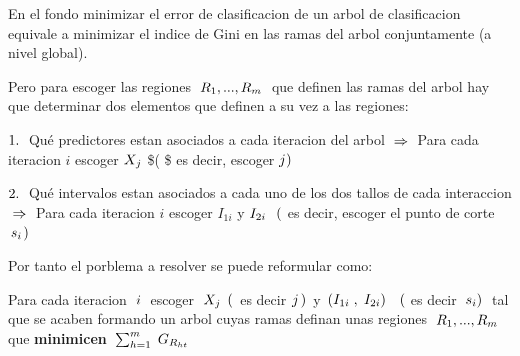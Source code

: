 \documentclass[
  11pt,
  a4paper,
]{article}
\begin{document}
En el fondo minimizar el error de clasificacion de un arbol de
clasificacion equivale a minimizar el indice de Gini en las ramas del
arbol conjuntamente (a nivel global).

\vspace{0.35cm}

Pero para escoger las regiones
\(\hspace{0.1cm} R_1,...,R_m \hspace{0.1cm}\) que definen las ramas del
arbol hay que determinar dos elementos que definen a su vez a las
regiones:

\(1.\hspace{0.1cm}\) Qué predictores estan asociados a cada iteracion
del arbol \(\hspace{0.1cm} \Rightarrow \hspace{0.1cm}\) Para cada
iteracion \(i\) escoger \(X_j \hspace{0.01cm}\) \$(\hspace{0.01cm} \$ es
decir, escoger \(j \hspace{0.01cm})\)

\(2.\hspace{0.1cm}\) Qué intervalos estan asociados a cada uno de los
dos tallos de cada interaccion
\(\hspace{0.1cm} \Rightarrow \hspace{0.1cm}\) Para cada iteracion \(i\)
escoger \(I_{1i}\) y \(I_{2i}\hspace{0.1cm}\) \((\hspace{0.01cm}\) es
decir, escoger el punto de corte
\(\hspace{0.07cm}s_i \hspace{0.04cm} )\)

\vspace{0.35cm}

Por tanto el porblema a resolver se puede reformular como:

Para cada iteracion \(\hspace{0.1cm} i \hspace{0.1cm}\) escoger
\(\hspace{0.1cm} X_j\hspace{0.01cm}\) \((\hspace{0.05cm}\) es decir
\(\hspace{0.01cm}j \hspace{0.05cm})\hspace{0.05cm}\) y
\(\hspace{0.05cm}( I_{1i}\hspace{0.1cm},\hspace{0.1cm}I_{2i} )\hspace{0.1cm}\)
\(\hspace{0.1cm}(\) es decir \(\hspace{0.1cm} s_i)\hspace{0.1cm}\) tal
que se acaben formando un arbol cuyas ramas definan unas regiones
\(\hspace{0.1cm}R_1,...,R_m\hspace{0.1cm}\) que \textbf{minimicen}
\(\hspace{0.1cm}\sum_{h=1}^{m} \hspace{0.1cm} G_{R_{ht}}\)
\end{document}
